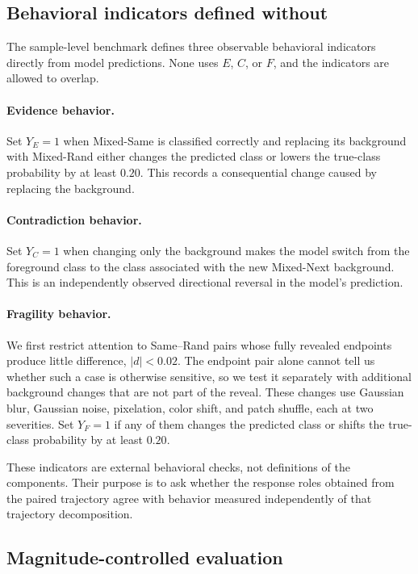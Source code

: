 \subsection{Behavioral indicators defined without \decaf}
\label{app:imagenet9-labels}

The sample-level benchmark defines three observable behavioral indicators directly from model predictions. None uses $E$, $C$, or $F$, and the indicators are allowed to overlap.

\paragraph{Evidence behavior.}
Set $Y_E=1$ when Mixed-Same is classified correctly and replacing its background with Mixed-Rand either changes the predicted class or lowers the true-class probability by at least $0.20$. This records a consequential change caused by replacing the background.

\paragraph{Contradiction behavior.}
Set $Y_C=1$ when changing only the background makes the model switch from the foreground class to the class associated with the new Mixed-Next background. This is an independently observed directional reversal in the model's prediction.

\paragraph{Fragility behavior.}
We first restrict attention to Same--Rand pairs whose fully revealed endpoints produce little difference, $|d|<0.02$. The endpoint pair alone cannot tell us whether such a case is otherwise sensitive, so we test it separately with additional background changes that are not part of the \decaf reveal. These changes use Gaussian blur, Gaussian noise, pixelation, color shift, and patch shuffle, each at two severities. Set $Y_F=1$ if any of them changes the predicted class or shifts the true-class probability by at least $0.20$.

These indicators are external behavioral checks, not definitions of the \decaf components. Their purpose is to ask whether the response roles obtained from the paired trajectory agree with behavior measured independently of that trajectory decomposition.

\subsection{Magnitude-controlled evaluation}

